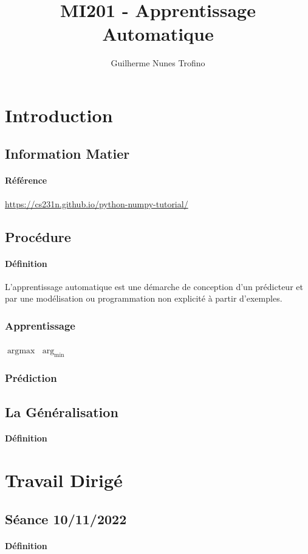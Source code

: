 \documentclass{article}
\title{MI201 - Apprentissage Automatique}
\author{Guilherme Nunes Trofino}
\begin{document}
\maketitle


\newpage\tableofcontents

\section{Introduction}

% 
% 


\subsection{Information Matier}
\paragraph{Référence}
\url{https://cs231n.github.io/python-numpy-tutorial/}


\subsection{Procédure}
\paragraph{Définition}L'apprentissage automatique est une démarche de conception d'un prédicteur et par une modélisation ou programmation non explicité à partir d'exemples.

\subsubsection{Apprentissage}
\paragraph{}
$\arg\text{max}$
$\arg_{\text{min}}$

\subsubsection{Prédiction}


\subsection{La Généralisation}
\paragraph{Définition}


\section{Travail Dirigé}
\subsection{Séance 10/11/2022}
\paragraph{Définition}
\end{document}
